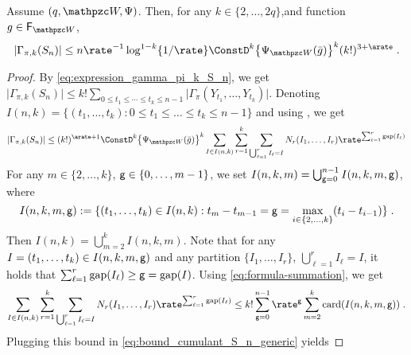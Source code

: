 \begin{lemma}
\label{lem:cumulant_bounds_final_generic}
Assume $(q,\lyapW,\normlike)$. Then,  for any $k \in \{2,\dots,2q\}$,and function $g \in \setfunction_{\lyapW}$,
\begin{equation}
\label{eq: Gpik estimate}
 |\Gamma_{\pi, k}(S_n)| \leq  n \rate^{-1} \log^{1-k}\{1/\rate\} \ConstD^{k}  \bigl\{\normlike_{\lyapW}(\bar{g})\bigr\}^{k} (k!)^{3+\arate} \eqsp.
\end{equation}
\end{lemma}
\begin{proof}
By \eqref{eq:expression_gamma_pi_k_S_n}, we get $ \bigl|\Gamma_{\pi,k}(S_n)\bigr| \leq k! \sum_{0\leq t_1 \leq \cdots \leq t_k \leq n-1} \bigl|\Gamma_{\pi}(Y_{t_1}, \ldots, Y_{t_k})\bigr|$.
Denoting $I(n,k) = \{ (t_1, \ldots, t_k): 0 \le t_1 \le \ldots \le t_k \le n-1  \}$ and using , we get
\begin{equation}
\label{eq:bound_cumulant_S_n_generic}
|\Gamma_{\pi, k}(S_n)|
  \leq (k!)^{\arate + 1} \ConstD^k \bigl\{\normlike_{\lyapW}(\bar{g})\bigr\}^{k} 
 \sum_{I \in I(n,k)} \sum_{r=1}^k \sum_{\bigcup_{\ell=1}^r I_\ell = I} N_r(I_1, \ldots, I_r) \rate^{\sum_{\ell=1}^r \maxgap(I_{\ell})}
\end{equation}
For any $m \in \{2,\dots,k\}$, $\mathsf{g} \in \{0,\dots,m-1\}$, we set $I(n,k,m)=\bigcup_{\mathsf{g}=0}^{n-1} I(n,k,m,\mathsf{g})$, where
\begin{equation}
  \label{eq:def_I_n_k_m_r_0_generic}
        I(n,k,m,\mathsf{g}): = \{ (t_1, \ldots, t_k) \in I(n,k): t_{m} - t_{m-1} = \mathsf{g} = \max_{i\in\{2,\ldots,k\}}(t_{i} - t_{i-1}) \} \;.
\end{equation}
Then $I(n,k) = \bigcup_{m=2}^{k} I(n,k,m)$. Note that for any $I = (t_1,\ldots,t_k) \in I(n,k,m,\mathsf{g})$ and any partition $ \{I_1,\ldots,I_r\}$, $\bigcup_{\ell=1}^r I_\ell = I$, it holds that $\sum_{\ell=1}^{r}\operatorname{gap}(I_{\ell}) \geq \mathsf{g}=\operatorname{gap}(I)$.
Using \eqref{eq:formula-summation}, we get
\begin{multline*}
\sum_{I \in I(n,k)} \sum_{r=1}^k \sum_{\bigcup_{\ell=1}^r I_\ell = I} N_r(I_1, \ldots, I_r) \rate^{\sum_{\ell=1}^r \maxgap(I_{\ell})} \leq k! \sum_{\gapindex=0}^{n-1} \rate^{\gapindex} \sum_{m=2}^k \card{I(n,k,m,\gapindex)}\eqsp.
\end{multline*}
Plugging this bound in \eqref{eq:bound_cumulant_S_n_generic} yields

\end{proof}
